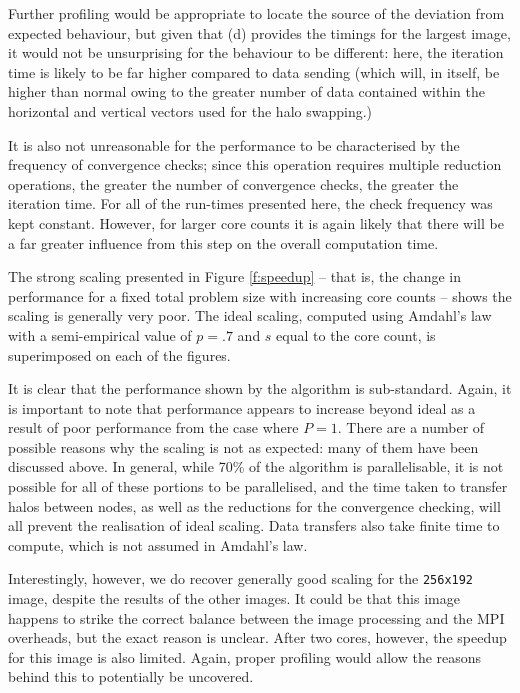 \documentclass{article} %
\begin{document}
Further profiling would be appropriate to locate the source of the deviation from expected behaviour, but given that (d) provides the timings for the largest image, it would not be unsurprising for the behaviour to be different: here, the iteration time is likely to be far higher compared to data sending (which will, in itself, be higher than normal owing to the greater number of data contained within the horizontal and vertical vectors used for the halo swapping.)

It is also not unreasonable for the performance to be characterised by the frequency of convergence checks; since this operation requires multiple reduction operations, the greater the number of convergence checks, the greater the iteration time. For all of the run-times presented here, the check frequency was kept constant. However, for larger core counts it is again likely that there will be a far greater influence from this step on the overall computation time.

The strong scaling presented in Figure \ref{f:speedup} -- that is, the change in performance for a fixed total problem size with increasing core counts -- shows the scaling is generally very poor.
The ideal scaling, computed using Amdahl's law with a semi-empirical value of $p = .7$ and $s$ equal to the core count, is superimposed on each of the figures.

It is clear that the performance shown by the algorithm is sub-standard. 
Again, it is important to note that performance appears to increase beyond ideal as a result of poor performance from the case where $P = 1$.
There are a number of possible reasons why the scaling is not as expected: many of them have been discussed above. 
In general, while 70\% of the algorithm is parallelisable, it is not possible for all of these portions to be parallelised, and the time taken to transfer halos between nodes, as well as the reductions for the convergence checking, will all prevent the realisation of ideal scaling.
Data transfers also take finite time to compute, which is not assumed in Amdahl's law.

Interestingly, however, we do recover generally good scaling for the \texttt{256x192} image, despite the results of the other images. It could be that this image happens to strike the correct balance between the image processing and the MPI overheads, but the exact reason is unclear.
After two cores, however, the speedup for this image is also limited.
Again, proper profiling would allow the reasons behind this to potentially be uncovered.
\end{document}
